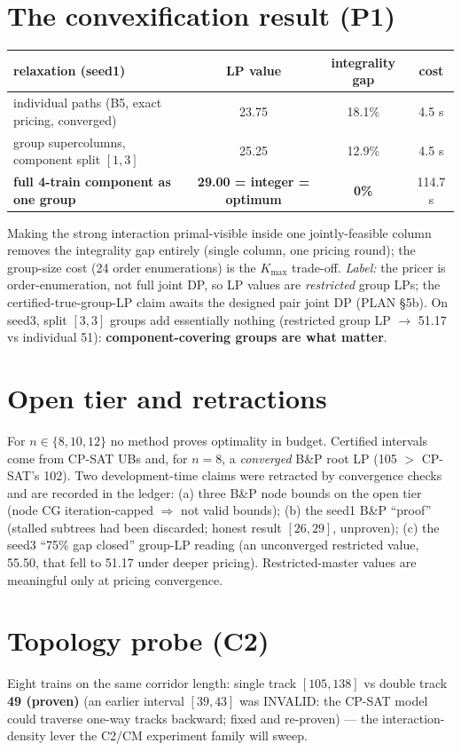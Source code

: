 \documentclass[11pt]{article}
\begin{document}
\section{The convexification result (P1)}
\begin{center}
\begin{tabular}{lccc}
\toprule
relaxation (seed1) & LP value & integrality gap & cost \\
\midrule
individual paths (B5, exact pricing, converged) & 23.75 & 18.1\% & 4.5 s \\
group supercolumns, component split $[1,3]$ & 25.25 & 12.9\% & 4.5 s \\
\textbf{full 4-train component as one group} & \textbf{29.00 = integer = optimum} & \textbf{0\%} & 114.7 s \\
\bottomrule
\end{tabular}
\end{center}
Making the strong interaction primal-visible inside one jointly-feasible column removes the
integrality gap entirely (single column, one pricing round); the group-size cost (24 order
enumerations) is the $K_{\max}$ trade-off. \emph{Label:} the pricer is order-enumeration, not full
joint DP, so LP values are \emph{restricted} group LPs; the certified-true-group-LP claim awaits the
designed pair joint DP (PLAN \S5b). On seed3, split $[3,3]$ groups add essentially nothing
(restricted group LP $\to$ 51.17 vs individual 51): \textbf{component-covering groups are what matter}.

\section{Open tier and retractions}
For $n\in\{8,10,12\}$ no method proves optimality in budget. Certified intervals come from CP-SAT
UBs and, for $n=8$, a \emph{converged} B\&P root LP (105 $>$ CP-SAT's 102). Two development-time
claims were retracted by convergence checks and are recorded in the ledger: (a) three B\&P node
bounds on the open tier (node CG iteration-capped $\Rightarrow$ not valid bounds); (b) the seed1 B\&P ``proof'' (stalled subtrees had been discarded; honest result $[26,29]$, unproven); (c) the seed3
``75\% gap closed'' group-LP reading (an unconverged restricted value, 55.50, that fell to 51.17
under deeper pricing). Restricted-master values are meaningful only at pricing convergence.

\section{Topology probe (C2)}
Eight trains on the same corridor length: single track $[105,138]$ vs double track \textbf{49 (proven)} (an earlier interval $[39,43]$ was INVALID: the CP-SAT model could traverse one-way tracks backward; fixed and re-proven) ---
the interaction-density lever the C2/CM experiment family will sweep.
\end{document}
